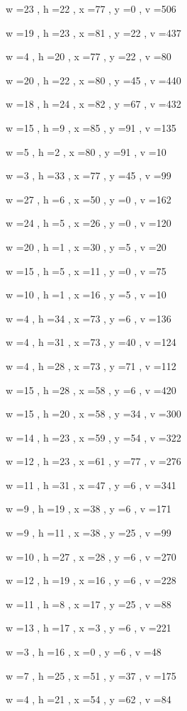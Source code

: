 \documentclass[11pt]{article}
\begin{document}
w =23 , h =22 , x =77 , y =0 , v =506
\par
w =19 , h =23 , x =81 , y =22 , v =437
\par
w =4 , h =20 , x =77 , y =22 , v =80
\par
w =20 , h =22 , x =80 , y =45 , v =440
\par
w =18 , h =24 , x =82 , y =67 , v =432
\par
w =15 , h =9 , x =85 , y =91 , v =135
\par
w =5 , h =2 , x =80 , y =91 , v =10
\par
w =3 , h =33 , x =77 , y =45 , v =99
\par
w =27 , h =6 , x =50 , y =0 , v =162
\par
w =24 , h =5 , x =26 , y =0 , v =120
\par
w =20 , h =1 , x =30 , y =5 , v =20
\par
w =15 , h =5 , x =11 , y =0 , v =75
\par
w =10 , h =1 , x =16 , y =5 , v =10
\par
w =4 , h =34 , x =73 , y =6 , v =136
\par
w =4 , h =31 , x =73 , y =40 , v =124
\par
w =4 , h =28 , x =73 , y =71 , v =112
\par
w =15 , h =28 , x =58 , y =6 , v =420
\par
w =15 , h =20 , x =58 , y =34 , v =300
\par
w =14 , h =23 , x =59 , y =54 , v =322
\par
w =12 , h =23 , x =61 , y =77 , v =276
\par
w =11 , h =31 , x =47 , y =6 , v =341
\par
w =9 , h =19 , x =38 , y =6 , v =171
\par
w =9 , h =11 , x =38 , y =25 , v =99
\par
w =10 , h =27 , x =28 , y =6 , v =270
\par
w =12 , h =19 , x =16 , y =6 , v =228
\par
w =11 , h =8 , x =17 , y =25 , v =88
\par
w =13 , h =17 , x =3 , y =6 , v =221
\par
w =3 , h =16 , x =0 , y =6 , v =48
\par
w =7 , h =25 , x =51 , y =37 , v =175
\par
w =4 , h =21 , x =54 , y =62 , v =84
\par
\newpage
\end{document}
